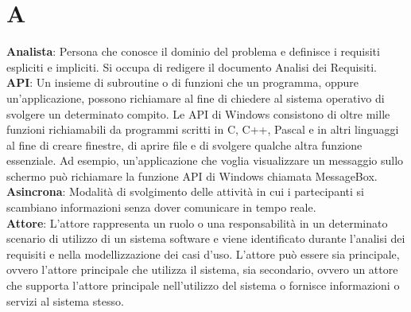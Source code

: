 \section{A}
\textbf{Analista}: Persona che conosce il dominio del problema e definisce i requisiti espliciti e impliciti. Si occupa di redigere il documento Analisi dei Requisiti.\\
\textbf{API}: Un insieme di subroutine o di funzioni che un programma, oppure un'applicazione, possono richiamare al fine di chiedere al sistema operativo
di svolgere un determinato compito. Le API di Windows consistono di oltre mille funzioni richiamabili da programmi scritti in C, C++,
Pascal e in altri linguaggi al fine di creare finestre, di aprire file e di svolgere qualche altra funzione essenziale. Ad esempio, un'applicazione 
che voglia visualizzare un messaggio sullo schermo può richiamare la funzione API di Windows chiamata MessageBox.\\
\textbf{Asincrona}: Modalità di svolgimento delle attività in cui i partecipanti si scambiano informazioni senza dover comunicare in tempo reale.\\
\textbf{Attore}: L'attore rappresenta un ruolo o una responsabilità in un determinato scenario di utilizzo di un sistema software e viene identificato durante l'analisi dei requisiti e nella modellizzazione dei casi d'uso. L'attore può essere sia principale, ovvero l'attore principale che utilizza il sistema, sia secondario, ovvero un attore che supporta l'attore principale nell'utilizzo del sistema o fornisce informazioni o servizi al sistema stesso.\\
